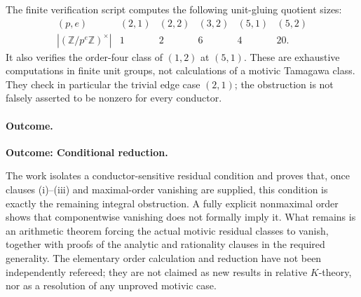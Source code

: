 \documentclass[11pt,a4paper]{article}
\newcommand{\Z}{\mathbb{Z}}
\numberwithin{equation}{section}
\begin{document}
The finite verification script computes the following unit-gluing quotient sizes:
\[
 \begin{array}{c|ccccc}
 (p,e)&(2,1)&(2,2)&(3,2)&(5,1)&(5,2)\\ \hline
 |(\Z/p^e\Z)^\times|&1&2&6&4&20.
 \end{array}
\] It also verifies the order-four class of $(1,2)$ at $(5,1)$. These are exhaustive computations in finite unit groups, not calculations of a motivic Tamagawa class. They check in particular the trivial edge case $(2,1)$; the obstruction is not falsely asserted to be nonzero for every conductor.

\paragraph{Outcome.}
\textbf{Outcome: Conditional reduction.}

The work isolates a conductor-sensitive residual condition and proves that, once clauses (i)--(iii) and maximal-order vanishing are supplied, this condition is exactly the remaining integral obstruction. A fully explicit nonmaximal order shows that componentwise vanishing does not formally imply it. What remains is an arithmetic theorem forcing the actual motivic residual classes to vanish, together with proofs of the analytic and rationality clauses in the required generality. The elementary order calculation and reduction have not been independently refereed; they are not claimed as new results in relative $K$-theory, nor as a resolution of any unproved motivic case.
\end{document}
